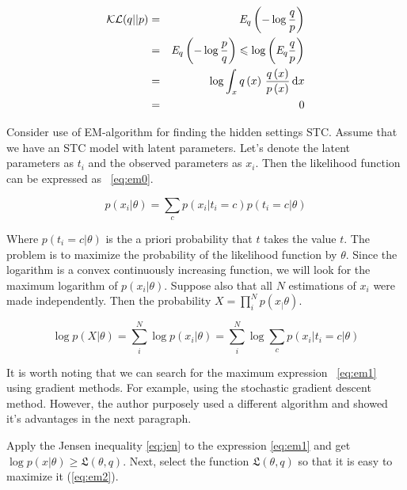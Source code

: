 \documentclass[12pt]{report}
\theoremstyle{definition}
\begin{document}
\begin{eqnarray}\label{eq:kl03}
	\mathcal{KL}(q\vert \vert p) 
	& = & \mathit{E}_q \left(  - \log	 \frac{q}{p} \right) \\
	& = & \mathit{E}_q \left(  - \log	 \frac{p}{q} \right) \leqslant  \log \left( \mathit{E}_q \frac{q}{p} \right)\\
	& = & \log \int_x q \left( x \right) \, \frac{q \left( x \right)}{p \left(  x \right)} \, {\rm d}x \\
	& = & 0
\end{eqnarray}

Consider use of EM-algorithm for finding the hidden settings STC.
Assume that we have an STC model with latent parameters. 
Let's denote the latent parameters as $t_i$ and the observed parameters as $x_i$. 
Then the likelihood function can be expressed as ~\ref{eq:em0}.

\begin{equation} \label{eq:em0}
p \left( x_i \vert	\theta \right) = \sum_c p \left( x_i \vert t_i = c \right) p \left( t_i = c \vert \theta \right) 
\end{equation}

Where $p \left (t_i = c \vert \theta \right)$ is the a priori probability that $t$ takes the value $t$. 
The problem is to maximize the probability of the likelihood function by $\theta$. 
Since the logarithm is a convex continuously increasing function, we will look for the maximum logarithm of $p \left( x_i \vert \theta \right)$. 
Suppose also that all $N$ estimations of $x_i$ were made independently. 
Then the probability $X = \prod_i^N p \left( x_ \vert \theta \right) $.

\begin{equation} \label{eq:em1}
\log p \left(  X \vert	\theta \right) = \sum_i^N \log p \left( x_i \vert \theta \right) = \sum_i^N \log \sum_c p \left(  x_i \vert t_i = c \vert \theta \right)
\end{equation}

It is worth noting that we can search for the maximum expression ~\ref{eq:em1} using gradient methods. 
For example, using the stochastic gradient descent method. 
However, the author purposely used a different algorithm and showed it's advantages in the next paragraph.

Apply the Jensen inequality \ref{eq:jen} to the expression \ref{eq:em1} and get $\log p \left( x \vert \theta \right) \geqslant \mathfrak{L} \left( \theta, q \right)$.
Next, select the function $\mathfrak{L} \left( \theta, q \right)$ so that it is easy to maximize it (\ref{eq:em2}).
\end{document}

